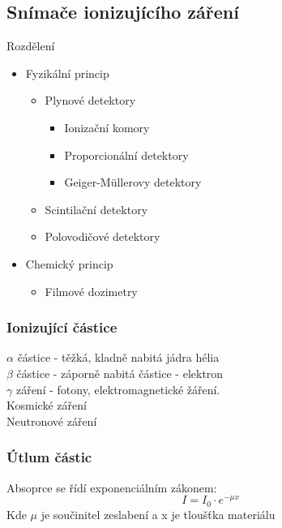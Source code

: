 \subsection*{Snímače ionizujícího záření}
Rozdělení
\begin{itemize}
    \item Fyzikální princip
          \begin{itemize}
              \item Plynové detektory
                    \begin{itemize}
                        \item Ionizační komory
                        \item Proporcionální detektory
                        \item Geiger-Müllerovy detektory
                    \end{itemize}
              \item Scintilační detektory
              \item  Polovodičové detektory
          \end{itemize}
    \item Chemický princip
          \begin{itemize}
              \item Filmové dozimetry
          \end{itemize}
\end{itemize}
\subsubsection*{Ionizující částice}
\(\alpha\) částice - těžká, kladně nabitá jádra hélia\\
\(\beta\) částice - záporně nabitá částice - elektron\\
\(\gamma\) záření - fotony, elektromagnetické žáření.\\
Kosmické záření\\
Neutronové záření\\
\subsubsection*{Útlum částic}
Absoprce se řídí exponenciálním zákonem:
\begin{equation}
    I = I_0\cdot e^{-\mu x}
\end{equation}
Kde \(\mu\) je součinitel zeslabení a x je tloušťka materiálu\\

